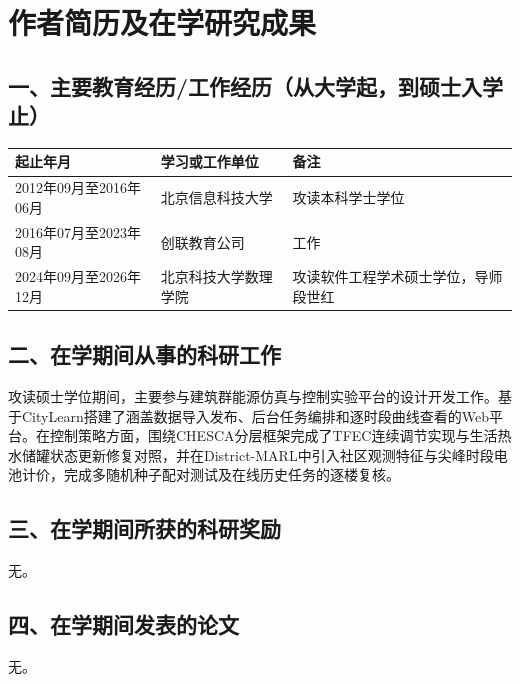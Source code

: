 \chapter*{作者简历及在学研究成果}

\section*{一、主要教育经历/工作经历（从大学起，到硕士入学止）}

\noindent\begin{tabularx}{\textwidth}{|>{\centering\arraybackslash}X|>{\centering\arraybackslash}X|>{\centering\arraybackslash}X|}
  \hline
  起止年月 & 学习或工作单位 & 备注 \\\hline
  2012年09月至2016年06月 & 北京信息科技大学 & 攻读本科学士学位 \\\hline
  2016年07月至2023年08月 & 创联教育公司 & 工作 \\\hline
  2024年09月至2026年12月 & 北京科技大学数理学院 & 攻读软件工程学术硕士学位，导师段世红 \\\hline
  \end{tabularx}

\section*{二、在学期间从事的科研工作}

攻读硕士学位期间，主要参与建筑群能源仿真与控制实验平台的设计开发工作。基于CityLearn搭建了涵盖数据导入发布、后台任务编排和逐时段曲线查看的Web平台。在控制策略方面，围绕CHESCA分层框架完成了TFEC连续调节实现与生活热水储罐状态更新修复对照，并在District-MARL中引入社区观测特征与尖峰时段电池计价，完成多随机种子配对测试及在线历史任务的逐楼复核。

\section*{三、在学期间所获的科研奖励}

无。

\section*{四、在学期间发表的论文}

无。

\pagestyle{empty}
